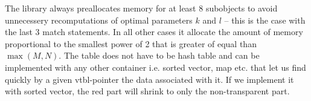 The library always preallocates memory for at least 8 subobjects to avoid 
unnecessery recomputations of optimal parameters $k$ and $l$ -- this is the case 
with the last 3 match statements. In all other cases it allocate the amount of 
memory proportional to the smallest power of 2 that is greater of equal than  
$\max(M,N)$. The table does not have to be hash table and can be implemented with 
any other container i.e. sorted vector, map etc. that let us find quickly by a given 
vtbl-pointer the data associated with it. If we implement it with sorted vector, 
the red part will shrink to only the non-transparent part.


%


